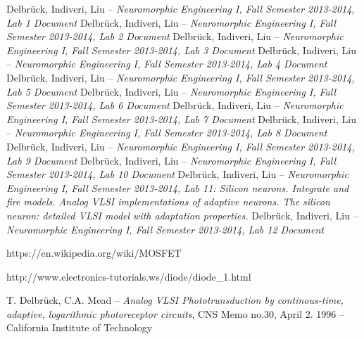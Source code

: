 \documentclass[main]{subfiles}
\begin{document}
\begin{thebibliography}{7}
Delbrück, Indiveri, Liu -- \emph{Neuromorphic Engineering I, Fall Semester 2013-2014, Lab 1 Document}
Delbrück, Indiveri, Liu -- \emph{Neuromorphic Engineering I, Fall Semester 2013-2014, Lab 2 Document}
Delbrück, Indiveri, Liu -- \emph{Neuromorphic Engineering I, Fall Semester 2013-2014, Lab 3 Document}
Delbrück, Indiveri, Liu -- \emph{Neuromorphic Engineering I, Fall Semester 2013-2014, Lab 4 Document}
Delbrück, Indiveri, Liu -- \emph{Neuromorphic Engineering I, Fall Semester 2013-2014, Lab 5 Document}
Delbrück, Indiveri, Liu -- \emph{Neuromorphic Engineering I, Fall Semester 2013-2014, Lab 6 Document}
Delbrück, Indiveri, Liu -- \emph{Neuromorphic Engineering I, Fall Semester 2013-2014, Lab 7 Document}
Delbrück, Indiveri, Liu -- \emph{Neuromorphic Engineering I, Fall Semester 2013-2014, Lab 8 Document}
Delbrück, Indiveri, Liu -- \emph{Neuromorphic Engineering I, Fall Semester 2013-2014, Lab 9 Document}
Delbrück, Indiveri, Liu -- \emph{Neuromorphic Engineering I, Fall Semester 2013-2014, Lab 10 Document}
Delbrück, Indiveri, Liu -- \emph{Neuromorphic Engineering I, Fall Semester 2013-2014, Lab 11: Silicon neurons. Integrate and fire models. Analog VLSI implementations of adaptive neurons. The silicon neuron: detailed VLSI model with adaptation properties. }
Delbrück, Indiveri, Liu -- \emph{Neuromorphic Engineering I, Fall Semester 2013-2014, Lab 12 Document}

https://en.wikipedia.org/wiki/MOSFET

http://www.electronics-tutorials.ws/diode/diode_1.html

T. Delbrück, C.A. Mead -- \emph{Analog VLSI Phototrunsduction by continous-time, adaptive, logarithmic photoreceptor circuits}, CNS Memo no.30, April 2. 1996 -- California Institute of Technology

\end{thebibliography}
\end{document}
